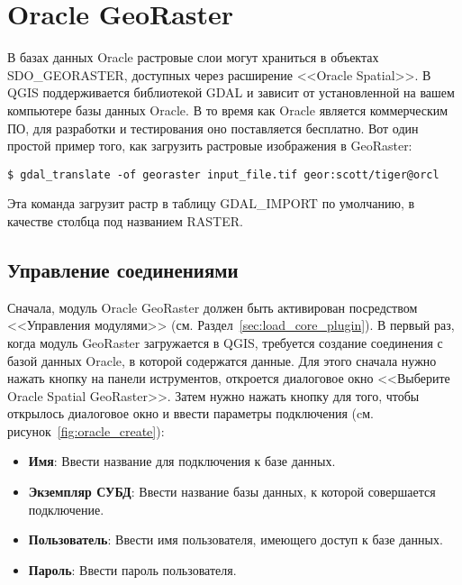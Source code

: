 
\section{Oracle GeoRaster}


В базах данных Oracle растровые слои могут храниться в объектах
SDO\_GEORASTER, доступных через расширение <<Oracle Spatial>>. В QGIS
 поддерживается
библиотекой GDAL и зависит от установленной на вашем компьютере базы
данных Oracle. В то время как Oracle является коммерческим ПО, для
разработки и тестирования оно поставляется бесплатно. Вот один простой
пример того, как загрузить растровые изображения в GeoRaster:

\begin{verbatim}
$ gdal_translate -of georaster input_file.tif geor:scott/tiger@orcl
\end{verbatim}

Эта команда загрузит растр в таблицу GDAL\_IMPORT по умолчанию, в
качестве столбца под названием RASTER.

\subsection{Управление соединениями}

Сначала, модуль Oracle GeoRaster должен быть активирован посредством
<<Управления модулями>> (см. Раздел~\ref{sec:load_core_plugin}). В 
первый раз, когда модуль GeoRaster загружается в QGIS, требуется
создание соединения с базой данных Oracle, в которой содержатся данные.
Для этого сначала нужно нажать кнопку
 на панели
иструментов, откроется диалоговое окно <<Выберите Oracle Spatial GeoRaster>>.
Затем нужно нажать кнопку  для того, чтобы открылось
диалоговое окно и ввести параметры подключения (cм. рисунок~\ref{fig:oracle_create}):

\begin{itemize}[label=--]
\item \textbf{Имя}: Ввести название для подключения к базе данных.
\item \textbf{Экземпляр СУБД}: Ввести название базы данных, к которой
совершается подключение.
\item \textbf{Пользователь}: Ввести имя пользователя, имеющего доступ
к базе данных.
\item \textbf{Пароль}: Ввести пароль пользователя.
\end{itemize}


